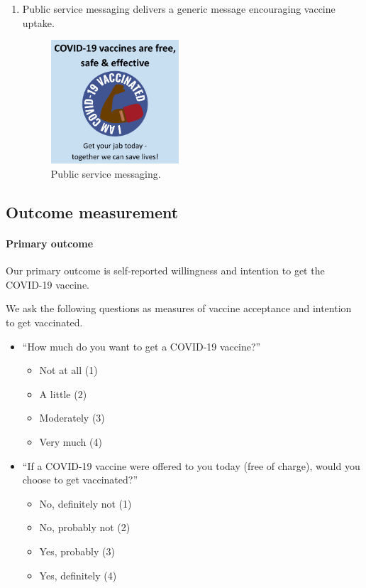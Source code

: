 \documentclass[letterpaper, 12pt, parskip=full,DIV=10]{scrartcl}
\begin{document}
\begin{enumerate}
\begin{enumerate}
  \end{enumerate}
  \item {Public service messaging} delivers a generic message encouraging vaccine uptake. 
  \begin{figure}[h!]
   \centering
   \includegraphics[width = 0.45\textwidth]{../../tables-figures/psa.png} 
   \caption{Public service messaging.}
   \label{fig:psa}
\end{figure}
\end{enumerate}


\subsection{Outcome measurement}

\paragraph{Primary outcome}
Our primary outcome is self-reported willingness and intention to get the COVID-19 vaccine.

We ask the following questions as measures of vaccine acceptance and intention to get vaccinated. 

\begin{itemize}
\item ``How much do you want to get a COVID-19 vaccine?''
\begin{itemize}
\item Not at all (1)
\item A little (2)
\item Moderately (3)
 \item Very much (4)
\end{itemize}
\item ``If a COVID-19 vaccine were offered to you today (free of charge), would you choose to get vaccinated?''
\begin{itemize}
\item No, definitely not (1) 
\item No, probably not (2)
\item Yes, probably (3)
\item Yes, definitely (4)
\end{itemize}
\end{itemize}
\end{document}
